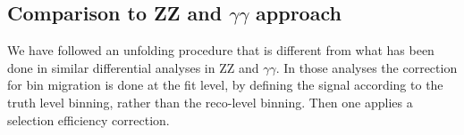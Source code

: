 
\subsection{Comparison to ZZ and $\gamma\gamma$ approach}
We have followed an unfolding procedure that is different from what has been
done in similar differential analyses in ZZ and $\gamma\gamma$. In those
analyses the correction for bin migration is done at the fit level, by
defining the signal according to the truth level binning, rather than the
reco-level binning. Then one applies a selection efficiency correction.

